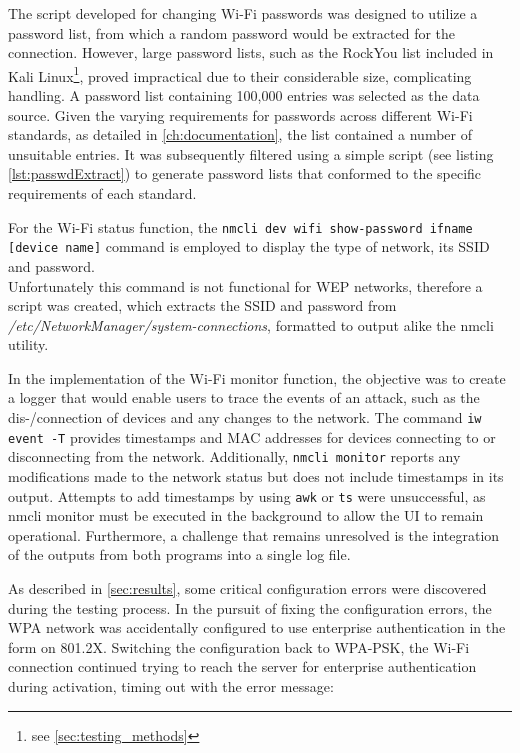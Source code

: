 The script developed for changing Wi-Fi passwords was designed to utilize a password list, from which a random password would be extracted for the connection. 
However, large password lists, such as the RockYou list included in Kali Linux\footnote{see \cref{sec:testing_methods}}, proved impractical due to their considerable size, complicating handling.
A password list containing 100,000 entries was selected as the data source. 
Given the varying requirements for passwords across different Wi-Fi standards, as detailed in \cref{ch:documentation}, the list contained a number of unsuitable entries.
It was subsequently filtered using a simple script (see listing \ref{lst:passwdExtract}) to generate password lists that conformed to the specific requirements of each standard.



For the Wi-Fi status function, the \lstinline[breaklines=true]|nmcli dev wifi show-password ifname [device name]| command is employed to display the type of network, its SSID and password.
\\Unfortunately this command is not functional for WEP networks, therefore a script was created, which extracts the SSID and password from \textit{/etc/NetworkManager/system-connections}, formatted to output alike the nmcli utility.

In the implementation of the Wi-Fi monitor function, the objective was to create a logger that would enable users to trace the events of an attack, such as the dis-/connection of devices and any changes to the network.
The command \lstinline[]|iw event -T| provides timestamps and MAC addresses for devices connecting to or disconnecting from the network. 
Additionally, \lstinline[]|nmcli monitor| reports any modifications made to the network status but does not include timestamps in its output. 
Attempts to add timestamps by using \lstinline[]|awk| or \lstinline[]|ts| were unsuccessful, as nmcli monitor must be executed in the background to allow the UI to remain operational. 
Furthermore, a challenge that remains unresolved is the integration of the outputs from both programs into a single log file.

As described in \cref{sec:results}, some critical configuration errors were discovered during the testing process.
In the pursuit of fixing the configuration errors, the WPA network was accidentally configured to use enterprise authentication in the form on 801.2X.
Switching the configuration back to WPA-PSK, the Wi-Fi connection continued trying to reach the server for enterprise authentication during activation, timing out with the error message:

